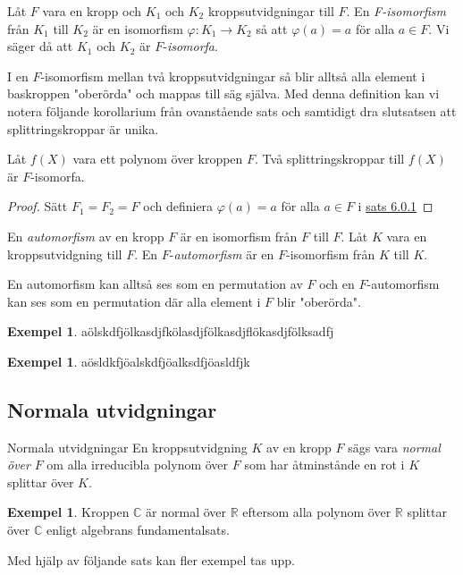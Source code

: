 \documentclass{article}
\theoremstyle{definition}
\newtheorem{exmp}[thm]{Exempel}
\begin{document}
\begin{mydef}{}{}
  Låt $F$ vara en kropp och $K_1$ och $K_2$ kroppsutvidgningar till $F$. En \textit{F-isomorfism} från $K_1$ till $K_2$ är en isomorfism 
  $\varphi: K_1 \rightarrow K_2$ så att $\varphi(a) = a$ för alla $a \in F.$ Vi säger då att $K_1$ och $K_2$ är $F$-\textit{isomorfa}.
\end{mydef}
I en $F$-isomorfism mellan två kroppsutvidgningar så blir alltså alla element i baskroppen "oberörda" och mappas till säg själva. Med denna definition 
kan vi notera följande korollarium från ovanstående sats och samtidigt dra slutsatsen att splittringskroppar är unika.

\hypertarget{kol6.2.1}{}
\begin{mykol}{}{}
  Låt $f(X)$ vara ett polynom över kroppen $F$. Två splittringskroppar till $f(X)$ är $F$-isomorfa. 
\end{mykol}
\begin{proof}
  Sätt $F_1 = F_2 = F$ och definiera $\varphi(a) = a$ för alla $a \in F$ i \hyperlink{sats6.0.1}{sats 6.0.1}
\end{proof}

\begin{mydef}{}{}
  En \textit{automorfism} av en kropp $F$ är en isomorfism från $F$ till $F$. Låt $K$ vara en kroppsutvidgning till $F$. En $F$-\textit{automorfism} 
  är en $F$-isomorfism från $K$ till $K.$
\end{mydef}
En automorfism kan alltså ses som en permutation av $F$ och en $F$-automorfism kan ses som en permutation där alla element i $F$ blir "oberörda".
\begin{exmp}
  aölskdfjölkasdjfkölasdjfölkasdjflökasdjfölksadfj
\end{exmp}
\begin{exmp}
  aösldkfjöalskdfjöalksdfjöasldfjk
\end{exmp}

\subsection{Normala utvidgningar}
\begin{mydef}{Normala utvidgningar}{}
  En kroppsutvidgning $K$ av en kropp $F$ sägs vara \textit{normal över} $F$ om alla irreducibla polynom över $F$ som har åtminstånde en rot i $K$ splittar 
  över $K$.
\end{mydef}

\begin{exmp}
  Kroppen $\mathbb{C}$ är normal över $\mathbb{R}$ eftersom alla polynom över $\mathbb{R}$ splittar över $\mathbb{C}$ enligt 
  algebrans fundamentalsats. 
\end{exmp}
Med hjälp av följande sats kan fler exempel tas upp. 
\end{document}
